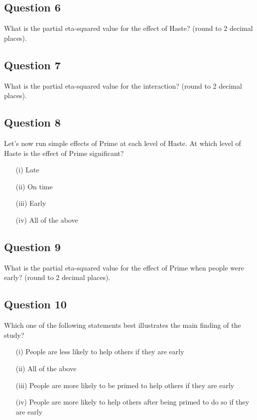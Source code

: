 \documentclass[12pt]{article}
\begin{document}
\subsection*{Question 6}
What is the partial eta-squared value for the effect of Haste? (round to 2 decimal places).


\subsection*{Question 7}
What is the partial eta-squared value for the interaction? (round to 2 decimal places).


\subsection*{Question 8}
Let's now run simple effects of Prime at each level of Haste. At which level of Haste is the effect of Prime significant?
\begin{itemize}
\item[(i)] Late
\item[(ii)] On time
\item[(iii)] Early
\item[(iv)] All of the above
\end{itemize}
\subsection*{Question 9}
What is the partial eta-squared value for the effect of Prime when people were early? (round to 2 decimal places).


\subsection*{Question 10}
Which one of the following statements best illustrates the main finding of the study?

\begin{itemize}
\item[(i)] People are less likely to help others if they are early
\item[(ii)] All of the above
\item[(iii)] People are more likely to be primed to help others if they are early
\item[(iv)] People are more likely to help others after being primed to do so if they are early
\end{itemize}
\end{document}
